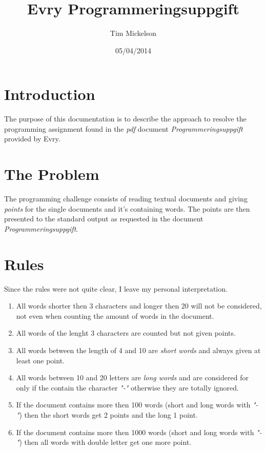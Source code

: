 \documentclass[a4paper]{article}
\title{Evry Programmeringsuppgift}
\author{Tim Mickelson}
\date{05/04/2014}
\begin{document}
\maketitle

\newpage

\section{Introduction}
The purpose of this documentation is to describe the approach to resolve the programming assignment found in the \textit{pdf} document \textit{Programmeringsuppgift} provided by Evry\cite{pdf}.

\section{The Problem}
The programming challenge consists of reading textual documents and giving \textit{points} for the single documents and it's containing words. The points are then presented to the standard output as requested in the
document \textit{Programmeringsuppgift}.

\section{Rules}
Since the rules were not quite clear, I leave my personal interpretation. 
\begin{enumerate}
	\item All words shorter then 3 characters and longer then 20 will not be considered, not even when counting the amount of words in the document.
	\item All words of the lenght 3 characters are counted but not given points.
	\item All words between the length of 4 and 10 are \textit{short words} and always given at least one point.
	\item All words between 10 and 20 letters are \textit{long words} and are considered for only if the contain the character \textit{"-"} otherwise they are totally ignored.
	\item If the document contains more then 100 words (short and long words with \textit{"-"}) then the short words get 2 points and the long 1 point.
	\item If the document contains more then 1000 words (short and long words with \textit{"-"}) then all words with double letter get one more point.
\end{enumerate}
\end{document}
